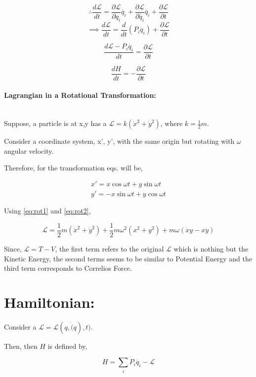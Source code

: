 \documentclass[a4paper]{article}
\newcommand{\Lagr}{\mathcal{L}}
\newcommand{\ddt}{\frac{d}{dt}}
\newcommand{\ddtf}[1]{\frac{d #1}{dt}}
\newcommand{\pdt}[2]{\frac{\partial #1}{\partial #2}}
\newcommand{\half}{\frac{1}{2}}
\begin{document}
				$$ \therefore \ddtf{\Lagr} = \pdt{\Lagr}{q_i}\dot{q_i} + \pdt{\Lagr}{\dot{q_i}}\ddot{q_i} + \pdt{\Lagr}{t} $$
				$$ \implies \ddtf{\Lagr} = \ddt(P_i \dot{q_i}) + \pdt{\Lagr}{t} $$

				$$ \ddtf{\Lagr - P_i \dot{q_i}} = \pdt{\Lagr}{t} $$

				\begin{equation}
					\ddtf{H} = - \pdt{\Lagr}{t}
				\end{equation}


	\paragraph*{Lagrangian in a Rotational Transformation: }\noindent\hfill\\
		 
		Suppose, a particle is at x,y has a $\Lagr = k (\dot{x}^2 + \dot{y}^2)$, where $ k = \half m $.

		Consider a coordinate system, {x', y'}, with the same origin but rotating with $\omega$ angular velocity.

		Therefore, for the transformation eqs. will be,

		\begin{eqnarray}
			x' = x\cos{\omega t} + y\sin{\omega t}\label{eq:rot1} \\
			y' = -x\sin{\omega t} + y\cos{\omega t}\label{eq:rot2}
		\end{eqnarray}
		

		Using \eqref{eq:rot1} and \eqref{eq:rot2},

		\begin{equation}
			\Lagr = \half m (\dot{x}^2 + \dot{y}^2) + \half m \omega^2(x^2 + y^2) + m \omega (\dot{x}y - x\dot{y})
		\end{equation}

		Since, $ \Lagr = T - V $, the first term refers to the original $\Lagr$ which is nothing but the Kinetic Energy, the second terms seems to be similar to Potential Energy and the third term corresponds to Correlios Force.


	\section*{Hamiltonian: }
		\noindent \hfill

		Consider a $\Lagr = \Lagr(q, \dot(q), t)$.

		Then, then $H$ is defined by, 

		\begin{equation}
			H = \sum_i P_i \dot{q_i} - \Lagr
		\end{equation}
\end{document}
